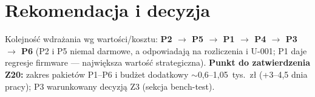 \documentclass[11pt,a4paper]{article}
\begin{document}
\section{Rekomendacja i decyzja}
Kolejność wdrażania wg wartości/kosztu: \textbf{P2 $\to$ P5 $\to$ P1 $\to$ P4 $\to$ P3 $\to$ P6}
(P2 i P5 niemal darmowe, a odpowiadają na rozliczenia i U-001; P1 daje regresje firmware ---
największa wartość strategiczna). \textbf{Punkt do zatwierdzenia Z20:} zakres pakietów P1--P6
i budżet dodatkowy $\sim$0,6--1,05~tys.~zł (+3--4,5 dnia pracy); P3 warunkowany decyzją Z3
(sekcja bench-test).
\end{document}
